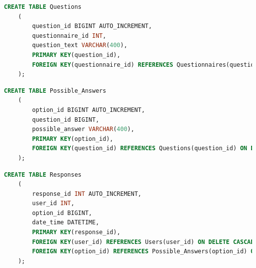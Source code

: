 \documentclass[12pt, oneside, a4paper]{article}
\begin{document}
    \begin{lstlisting}[language=SQL, columns=flexible, breaklines]
    CREATE TABLE Questions
    (
        question_id BIGINT AUTO_INCREMENT,
        questionnaire_id INT,
        question_text VARCHAR(400),
        PRIMARY KEY(question_id),
        FOREIGN KEY(questionnaire_id) REFERENCES Questionnaires(questionnaire_id) ON DELETE CASCADE
    );
    \end{lstlisting}
    \begin{lstlisting}[language=SQL, columns=flexible, breaklines]
    CREATE TABLE Possible_Answers
    (
        option_id BIGINT AUTO_INCREMENT,
        question_id BIGINT,
        possible_answer VARCHAR(400),
        PRIMARY KEY(option_id),
        FOREIGN KEY(question_id) REFERENCES Questions(question_id) ON DELETE CASCADE
    );
    \end{lstlisting}
    \begin{lstlisting}[language=SQL, columns=flexible, breaklines]
    CREATE TABLE Responses
    (
        response_id INT AUTO_INCREMENT,
        user_id INT,
        option_id BIGINT,
        date_time DATETIME,
        PRIMARY KEY(response_id),
        FOREIGN KEY(user_id) REFERENCES Users(user_id) ON DELETE CASCADE,
        FOREIGN KEY(option_id) REFERENCES Possible_Answers(option_id) ON DELETE CASCADE
    );
    \end{lstlisting}
\end{document}

